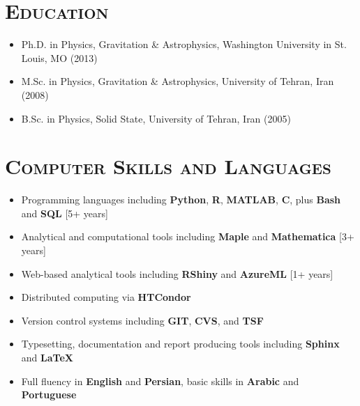 \documentclass[10pt,a4paper]{moderncv}
\begin{document}
\section{\textsc{Education}}
\begin{itemize}
\item Ph.D. in Physics, Gravitation \& Astrophysics, Washington University in St. Louis, MO (2013)
\item M.Sc. in Physics, Gravitation \& Astrophysics, University of Tehran, Iran (2008)
\item B.Sc. in Physics, Solid State, University of Tehran, Iran (2005)
\end{itemize}


\section{\textsc{Computer Skills and Languages}}
\begin{itemize}
\item Programming languages including \textbf{Python}, \textbf{R}, \textbf{MATLAB}, \textbf{C}, plus \textbf{Bash} and \textbf{SQL} [5+ years]
\item Analytical and computational tools including \textbf{Maple} and \textbf{Mathematica} [3+ years]
\item Web-based analytical tools including \textbf{RShiny} and \textbf{AzureML} [1+ years]
\item Distributed computing via \textbf{HTCondor}
\item Version control systems including \textbf{GIT}, \textbf{CVS}, and \textbf{TSF}
\item Typesetting, documentation and report producing tools including \textbf{Sphinx} and \textbf{\LaTeX}\\
\item Full fluency in \textbf{English} and \textbf{Persian}, basic skills in \textbf{Arabic} and \textbf{Portuguese}
\end{itemize}
\end{document}

